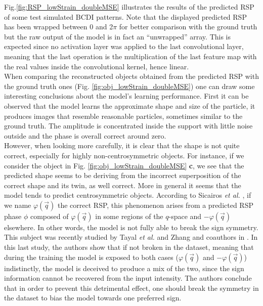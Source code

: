 Fig.\ref{fig:RSP_lowStrain_doubleMSE} illustrates the results of the predicted RSP of some test simulated BCDI patterns. 
Note that the displayed predicted RSP has been wrapped between 0 and 2$\pi$ for better comparison with the ground truth 
but the raw output of the model is in fact an ``unwrapped'' array. This is expected since no activation layer was applied 
to the last convolutional layer, meaning that the last operation is the multiplication of the last feature map with the 
real values inside the convolutional kernel, hence linear. \\
When comparing the reconstructed objects obtained from the predicted RSP with the ground truth ones (Fig. \ref{fig:obj_lowStrain_doubleMSE})
one can draw some interesting conclusions about the model's learning performance. 
First it can be observed that the model learns the approximate shape and size of the particle, it produces images 
that resemble reasonable particles, sometimes similar to the ground truth. The amplitude is concentrated inside 
the support with little noise outside and the phase is overall correct around zero. \\

However, when looking more carefully, 
it is clear that the shape is not quite correct, especially for highly non-centrosymmetric objects. For instance, if we 
consider the object in Fig. \ref{fig:obj_lowStrain_doubleMSE} \textbf{c}, we see that the predicted shape seems to be 
deriving from the incorrect superposition of the correct shape and its twin, as well correct. More in general it seems 
that the model tends to predict centrosymmetric objects. According to Sicairos \textit{et al.} \cite{guizar-sicairos_understanding_2012}, 
if we name $\varphi(\vec{q})$ the correct RSP, this phenomenon arises from a predicted RSP phase $\phi$ composed 
of $\varphi(\vec{q})$ in some regions of the $q$-space and $-\varphi(\vec{q})$ elsewhere. In other words, the model is not 
fully able to break the sign symmetry. This subject was recently studied by  Tayal \textit{et al.} \cite{tayal2020} and Zhang 
and coauthors in \cite{zhang_what_2024}. 
In this last study, the authors show that if not broken in the dataset, meaning that during the 
training the model is exposed to both cases ($\varphi(\vec{q})$ and $-\varphi(\vec{q})$) indistinctly, the model is deceived 
to produce a mix of the two, since the sign information cannot be recovered from the input intensity. The authors conclude that 
in order to prevent this detrimental effect, one should break the symmetry in the dataset to bias the model towards one 
preferred sign. 

